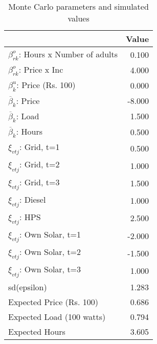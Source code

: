 \begin{table}[!ht]
	\centering
		\caption{Monte Carlo parameters and simulated values}
\begin{tabular}{lr}
		\toprule
               &     Value\\
		\midrule
		$\beta^o_{rk}$: Hours x Number of adults&     0.100\\
		$\beta^o_{rk}$: Price x Inc&     4.000\\
		$\beta^u_{k}$: Price (Rs. 100)&     0.000\\
		$\overline{\beta}_k$: Price&    -8.000\\
		$\overline{\beta}_k$: Load&     1.500\\
		$\overline{\beta}_k$: Hours&     0.500\\
		$\xi_{vtj}$: Grid, t=1&     0.500\\
		$\xi_{vtj}$: Grid, t=2&     1.000\\
		$\xi_{vtj}$: Grid, t=3&     1.500\\
		$\xi_{vtj}$: Diesel&     1.000\\
		$\xi_{vtj}$: HPS&     2.500\\
		$\xi_{vtj}$: Own Solar, t=1&    -2.000\\
		$\xi_{vtj}$: Own Solar, t=2&    -1.500\\
		$\xi_{vtj}$: Own Solar, t=3&     1.000\\
		    sd(epsilon)&     1.283\\
		Expected Price (Rs. 100)&     0.686\\
		Expected Load (100 watts)&     0.794\\
		 Expected Hours&     3.605\\
		\bottomrule
	\end{tabular}
\end{table}
